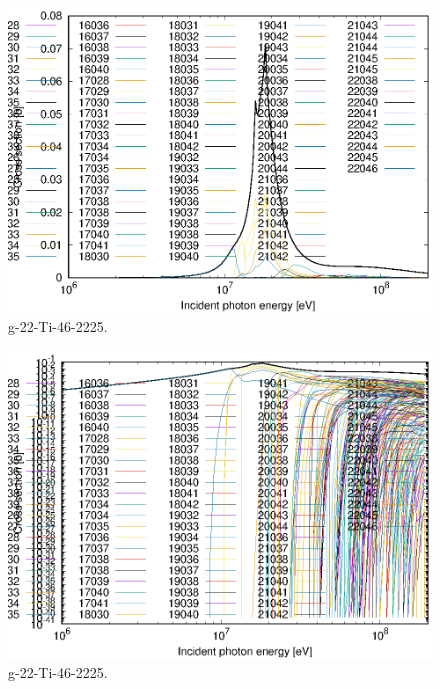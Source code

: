 \begin{figure}
 \includegraphics[width=\linewidth]{eps/g_22-Ti-46_2225.eps}
  \caption{g-22-Ti-46-2225.}
\end{figure}
\begin{figure}
 \includegraphics[width=\linewidth]{eps-log/g_22-Ti-46_2225.eps}
 \caption{g-22-Ti-46-2225.}
\end{figure}
\newpage \clearpage

